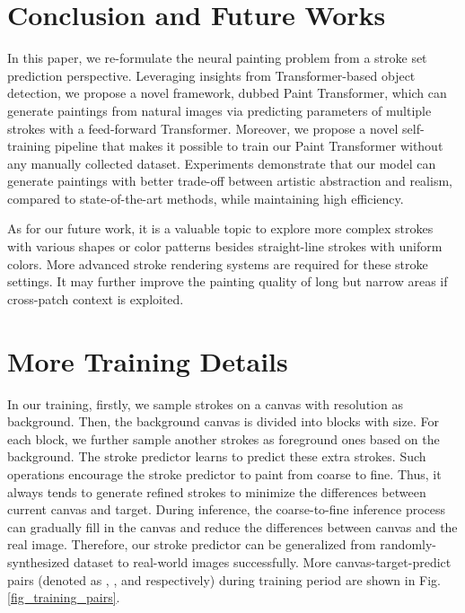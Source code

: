 \documentclass[10pt,twocolumn,letterpaper]{article}
\begin{document}
\section{Conclusion and Future Works}
In this paper, we re-formulate the neural painting problem from a stroke set prediction perspective.
Leveraging insights from Transformer-based object detection, we propose a novel framework, dubbed Paint Transformer, which can generate paintings from natural images via predicting parameters of multiple strokes with a feed-forward Transformer.
Moreover, we propose a novel self-training pipeline that makes it possible to train our Paint Transformer without any manually collected dataset. 
Experiments demonstrate that our model can generate paintings with better trade-off between artistic abstraction and realism, compared to state-of-the-art methods, while maintaining high efficiency. 

As for our future work, it is a valuable topic to explore more complex strokes with various shapes or color patterns besides straight-line strokes with uniform colors. 
More advanced stroke rendering systems are required for these stroke settings. 
It may further improve the painting quality of long but narrow areas if cross-patch context is exploited. 







{\small

\balance

}

\appendix



\twocolumn[{\begin{figure}[H]
\hsize=\textwidth \centering
\texttt{[image: Figure/training\_pairs.pdf]}
\caption{Canvas-target-predict pairs in training.}
\label{fig_training_pairs}
\end{figure}
}]

\section{More Training Details}
In our training, firstly, we sample  strokes on a canvas with  resolution as background. 
Then, the background canvas is divided into  blocks with  size. 
For each block, we further sample another  strokes as foreground ones based on the background. 
The stroke predictor learns to predict these extra strokes.
Such operations encourage the stroke predictor to paint from coarse to fine. 
Thus, it always tends to generate refined strokes to minimize the differences between current canvas and target. 
During inference, the coarse-to-fine inference process can gradually fill in the canvas and reduce the differences between canvas and the real image.
Therefore, our stroke predictor can be generalized from randomly-synthesized dataset to real-world images successfully. 
More canvas-target-predict pairs (denoted as , , and  respectively) during training period are shown in Fig. \ref{fig_training_pairs}.
\end{document}
